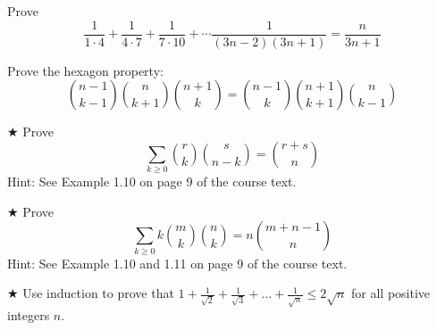 \begin{proofp}
Prove $$\frac{1}{1 \cdot 4}+\frac{1}{4 \cdot 7}+\frac{1}{7 \cdot 10}+ \cdots \frac{1}{(3n-2)(3n+1)}=\frac{n}{3n+1}$$
\end{proofp}

\begin{proofp}
Prove the hexagon property:
$$\binom{n-1}{k-1}\binom{n}{k+1}\binom{n+1}{k}=\binom{n-1}{k}\binom{n+1}{k+1}\binom{n}{k-1}$$
\end{proofp}








\begin{proofp} $\bigstar$
Prove $$\sum_{k\ge0}^{}\binom{r}{k}\binom{s}{n-k}=\binom{r+s}{n}$$
Hint: See Example 1.10 on page 9 of the course text.
\end{proofp}

\begin{proofp}$\bigstar$
Prove  $$\sum_{k\ge0}^{}k\binom{m}{k}\binom{n}{k}=n\binom{m+n-1}{n}$$
Hint: See Example 1.10 and 1.11 on page 9 of the course text.
\end{proofp}

\begin{proofp}$\bigstar$
Use induction to prove that $1+\frac{1}{\sqrt{2}}+\frac{1}{\sqrt{3}}+\ldots+\frac{1}{\sqrt{n}}\leq 2 \sqrt{n}$ for all positive integers $n$.
\end{proofp}

